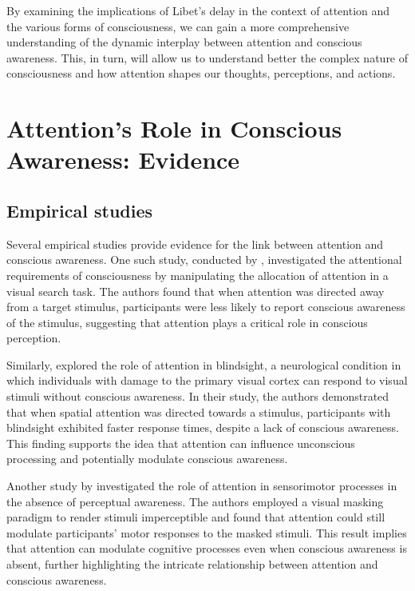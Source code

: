 \documentclass[10pt]{article}
\begin{document}
\begin{sloppypar}
  By examining the implications of Libet’s delay in the context of attention and the various forms of consciousness, we can gain a more comprehensive understanding of the dynamic interplay between attention and conscious awareness. This, in turn, will allow us to understand better the complex nature of consciousness and how attention shapes our thoughts, perceptions, and actions.

  \section{Attention's Role in Conscious Awareness: Evidence}
  \label{sec:evidence}

  \subsection{Empirical studies}
  \label{sec:empirical}

  Several empirical studies provide evidence for the link between attention and conscious awareness. One such study, conducted by \cite{cohen_attentional_2012}, investigated the attentional requirements of consciousness by manipulating the allocation of attention in a visual search task. The authors found that when attention was directed away from a target stimulus, participants were less likely to report conscious awareness of the stimulus, suggesting that attention plays a critical role in conscious perception.

  Similarly, \cite{kentridge_spatial_2004} explored the role of attention in blindsight, a neurological condition in which individuals with damage to the primary visual cortex can respond to visual stimuli without conscious awareness. In their study, the authors demonstrated that when spatial attention was directed towards a stimulus, participants with blindsight exhibited faster response times, despite a lack of conscious awareness. This finding supports the idea that attention can influence unconscious processing and potentially modulate conscious awareness.

  Another study by \cite{sumner_attentional_2006} investigated the role of attention in sensorimotor processes in the absence of perceptual awareness. The authors employed a visual masking paradigm to render stimuli imperceptible and found that attention could still modulate participants' motor responses to the masked stimuli. This result implies that attention can modulate cognitive processes even when conscious awareness is absent, further highlighting the intricate relationship between attention and conscious awareness.


\end{sloppypar}
\end{document}
